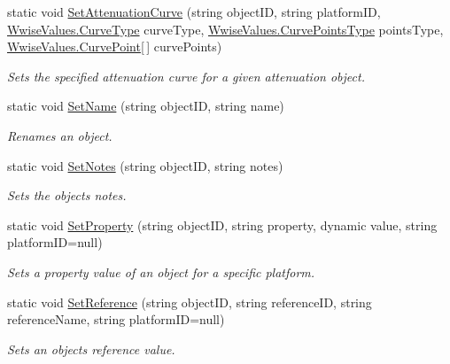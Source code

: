 \begin{DoxyCompactItemize}
static void \mbox{\hyperlink{classak_1_1wwise_1_1core_1_1_object_a03d302c6095e49eb94c36c07380b876f}{Set\+Attenuation\+Curve}} (string object\+ID, string platform\+ID, \mbox{\hyperlink{class_waapi_c_s_1_1_custom_values_1_1_wwise_values_a5fa07a83f99814d445c7075a3ebf4850}{Wwise\+Values.\+Curve\+Type}} curve\+Type, \mbox{\hyperlink{class_waapi_c_s_1_1_custom_values_1_1_wwise_values_ae8b620ede7bbe13a8185450675c9ca75}{Wwise\+Values.\+Curve\+Points\+Type}} points\+Type, \mbox{\hyperlink{class_waapi_c_s_1_1_custom_values_1_1_wwise_values_1_1_curve_point}{Wwise\+Values.\+Curve\+Point}}\mbox{[}$\,$\mbox{]} curve\+Points)
\begin{DoxyCompactList}\small\item\em Sets the specified attenuation curve for a given attenuation object. \end{DoxyCompactList}\item 
static void \mbox{\hyperlink{classak_1_1wwise_1_1core_1_1_object_ac98880315f64eaa506257673c9f638e0}{Set\+Name}} (string object\+ID, string name)
\begin{DoxyCompactList}\small\item\em Renames an object. \end{DoxyCompactList}\item 
static void \mbox{\hyperlink{classak_1_1wwise_1_1core_1_1_object_ac6aa5492ac6782b4f5aa0ce445be84dc}{Set\+Notes}} (string object\+ID, string notes)
\begin{DoxyCompactList}\small\item\em Sets the object\textquotesingle{}s notes. \end{DoxyCompactList}\item 
static void \mbox{\hyperlink{classak_1_1wwise_1_1core_1_1_object_a485460b1349b05ddb80eee242a9f63ea}{Set\+Property}} (string object\+ID, string property, dynamic value, string platform\+ID=null)
\begin{DoxyCompactList}\small\item\em Sets a property value of an object for a specific platform. \end{DoxyCompactList}\item 
static void \mbox{\hyperlink{classak_1_1wwise_1_1core_1_1_object_ad3a2457d498c4f72cec382ec45e4998f}{Set\+Reference}} (string object\+ID, string reference\+ID, string reference\+Name, string platform\+ID=null)
\begin{DoxyCompactList}\small\item\em Sets an object\textquotesingle{}s reference value. \end{DoxyCompactList}\end{DoxyCompactItemize}


